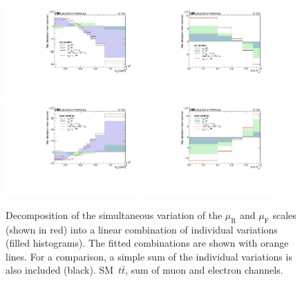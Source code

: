 \begin{figure}
  \centering
  \includegraphics[width=0.45\textwidth]{fig/chapt7/syst/MEScaleDecomp/MassTT_up.pdf}
  \includegraphics[width=0.45\textwidth]{fig/chapt7/syst/MEScaleDecomp/CosTopLepTT_up.pdf} \\
  \includegraphics[width=0.45\textwidth]{fig/chapt7/syst/MEScaleDecomp/MassTT_down.pdf}
  \includegraphics[width=0.45\textwidth]{fig/chapt7/syst/MEScaleDecomp/CosTopLepTT_down.pdf}
  \caption{Decomposition of the simultaneous variation of the $\mu_\text{R}$ and $\mu_\text{F}$ scales (shown in red) into a linear combination of individual variations (filled histograms). The fitted combinations are shown with orange lines. For a comparison, a simple sum of the individual variations is also included (black). SM~$t\bar t$, sum of muon and electron channels.}
  \label{Fig:MEScaleDecomp}
\end{figure}

